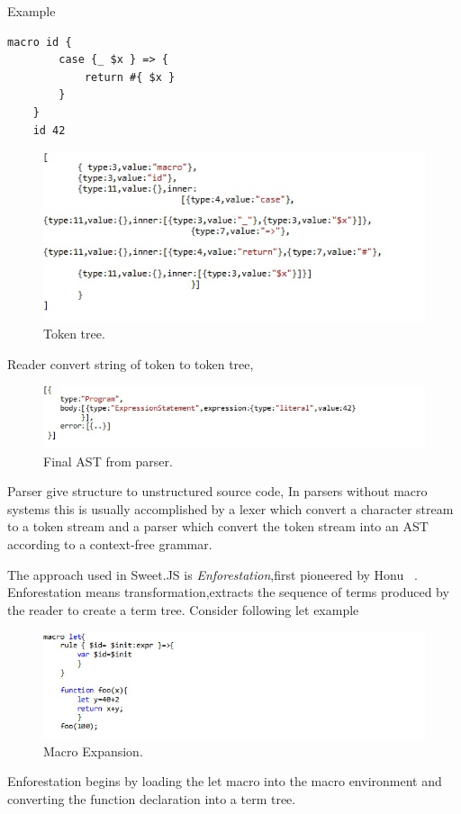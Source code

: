 Example

\begin{lstlisting}[frame=single]
	macro id {
  		case {_ $x } => {
   			return #{ $x }
  		}
	}
	id 42
\end{lstlisting}
\newpage
\begin{figure}[htb]
\centering
\includegraphics[width=1.0\textwidth]{images/readeroutput.jpg}
\caption{Token tree.} 
\label{fig:readeroutput}
\end{figure}
Reader convert string of token to token tree, 
\begin{figure}[htb]
\centering
\includegraphics[width=1.0\textwidth]{images/AST.jpg}
\caption{Final AST from parser.} 
\label{fig:AST}

\end{figure}

Parser give structure to unstructured source code, In parsers without macro systems this is usually accomplished by a lexer which convert a character stream to a token stream and a parser which convert the token stream into an AST according to a context-free grammar.

The approach used in Sweet.JS is \textit{Enforestation},first pioneered by Honu ~\cite{bib4}. Enforestation means transformation,extracts the sequence of terms produced by the reader to create a term tree. Consider following let example

\begin{figure}[htb]
\centering
\includegraphics[width=1.0\textwidth]{images/enforest.jpg}
\caption{Macro Expansion.} 
\label{fig:AST}

\end{figure}
Enforestation begins by loading the let macro into the macro environment and converting the function declaration into a term tree.

